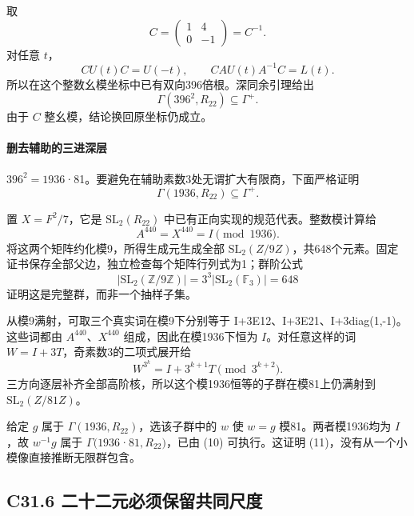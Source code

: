 {取} \[
C=\begin{pmatrix}1&4\\0&-1\end{pmatrix}=C^{-1}.
\] {对任意} {\ensuremath{t}，} \[
CU(t)C=U(-t),\qquad
CAU(t)A^{-1}C=L(t).
\] {所以在这个整数幺模坐标中已有双向396倍根。深同余引理给出} \[
\Gamma(396^2,R_{22})\subseteq\Gamma^+.
\tag{C31.10}
\] {由于} {\ensuremath{C}} {整幺模，结论换回原坐标仍成立。}

\paragraph*{\texorpdfstring{{删去辅助的三进深层}}{删去辅助的三进深层}}\label{C31-h205}

{\ensuremath{396^{2}=1936}·81。要避免在辅助素数3处无谓扩大有限商，下面严格证明} \[
\boxed{\Gamma(1936,R_{22})\subseteq\Gamma^+.}
\tag{C31.11}
\]

{置} {\ensuremath{X=F^{2}/7}，它是} {\ensuremath{\mathrm{SL}_{2}(R_{22})}} {中已有正向实现的规范代表。整数模计算给} \[
A^{440}=X^{440}=I\pmod {1936}.
\] {将这两个矩阵约化模9，所得生成元生成全部} {\ensuremath{\mathrm{SL}_{2}(Z/9Z)}，共648个元素。固定证书保存全部父边，独立检查每个矩阵行列式为1；群阶公式} \[
|\mathrm{SL}_2(\mathbb Z/9\mathbb Z)|=3^3|\mathrm{SL}_2(\mathbb F_3)|=648
\] {证明这是完整群，而非一个抽样子集。}

{从模9满射，可取三个真实词在模9下分别等于} {I+3E12、I+3E21、I+3diag(1,-1)。这些词都由} {\ensuremath{A^{440}}、\ensuremath{X^{440}}} {组成，因此在模1936下恒为} {\ensuremath{I}。对任意这样的词} {\ensuremath{W=I+3T}，奇素数3的二项式展开给} \[
W^{3^k}=I+3^{k+1}T\pmod {3^{k+2}}.
\] {三方向逐层补齐全部高阶核，所以这个模1936恒等的子群在模81上仍满射到} {\ensuremath{\mathrm{SL}_{2}(Z/81Z)}。}

{给定} {\ensuremath{g}} {属于} {\ensuremath{\Gamma (1936,R_{22})}，选该子群中的} {\ensuremath{w}} {使} {\ensuremath{w=g}} {模81。两者模1936均为} {\ensuremath{I}，故} {\ensuremath{w^{-1}g}} {属于} {\ensuremath{\Gamma (1936}·\ensuremath{81,R_{22})}，已由} {(10)} {可执行。这证明} {(11)，没有从一个小模像直接推断无限群包含。}

\subsection*{\texorpdfstring{{C31.6} {二十二元必须保留共同尺度}}{C31.6 二十二元必须保留共同尺度}}\label{C31-h206}


